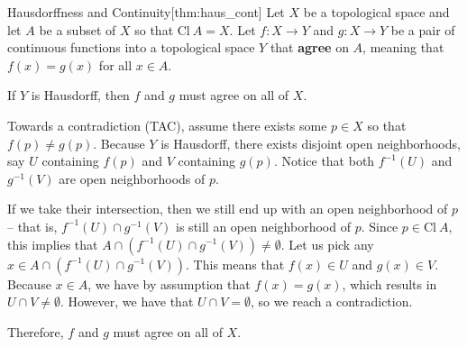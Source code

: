 \begin{thmBox}{Hausdorffness and Continuity}[thm:haus_cont]
    Let \( X \) be a topological space and let \( A \) be a subset of \( X \) so
    that \( \mathrm{Cl} \ A = X \).
    Let \( f: X \rightarrow Y \) and \( g: X \rightarrow Y \) be a pair of 
    continuous functions into a topological space \( Y \) that 
    \textbf{agree} on \( A \), meaning that \( f ( x ) = g ( x ) \) for all 
    \( x \in A \).

    \baseSkip 

    If \( Y \) is Hausdorff, then \( f \) and \( g \) must agree on all of
    \( X \).

    \baseRule

    \begin{proofBox}
        Towards a contradiction (TAC), assume there exists some \( p \in X \) so
        that \( f ( p ) \neq g ( p ) \).
        Because \( Y \) is Hausdorff, there exists disjoint open neighborhoods,
        say \( U  \) containing \( f ( p ) \) and \( V \) containing \( g ( p ) \).
        Notice that both \( f^{ -1 } ( U ) \) and \( g^{ -1 } ( V ) \) are  open neighborhoods of \( p \).

        \baseSkip 

        If we take their intersection, then we still end up with an open 
        neighborhood of \( p \) -- that is, 
        \( f^{ -1 } ( U ) \cap g^{ -1 } ( V ) \) is still an open neighborhood
        of \( p \).
        Since \( p \in \mathrm{Cl} \ A \), this implies that 
        \( A \cap ( f^{ -1 } ( U ) \cap g^{ -1 } ( V ) ) \neq \emptyset \).
        Let us pick any 
        \( x \in A \cap ( f^{ -1 } ( U ) \cap g^{ -1 } ( V ) ) \).
        This means that \( f ( x ) \in U \) and \( g ( x ) \in V \).
        Because \( x \in A \), we have by assumption that 
        \( f ( x ) = g( x ) \), which results in \( U \cap V \neq \emptyset \).
        However, we have that \( U \cap V = \emptyset \), so we reach a 
        contradiction.

        \baseSkip
        
        Therefore, \( f \) and \( g \) must agree on all of \( X \).
    \end{proofBox}
\end{thmBox}